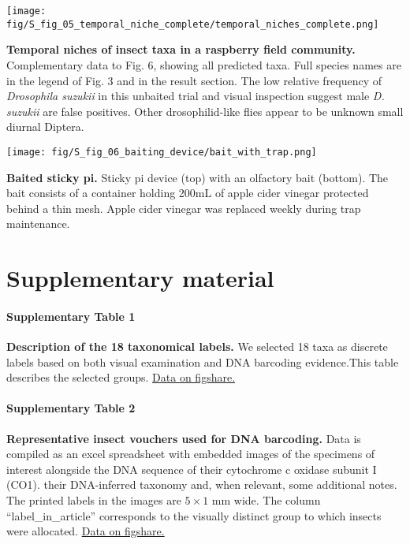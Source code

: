 \documentclass[12pt]{article}
\begin{document}
	\begin{supfig}[ht]
		\centering
		\texttt{[image: fig/S\_fig\_05\_temporal\_niche\_complete/temporal\_niches\_complete.png]}
		\caption{\textbf{Temporal niches of insect taxa in a raspberry field community.} Complementary data to Fig. 6, showing all predicted taxa. Full species names are in the legend of Fig. 3 and in the result section. The low relative frequency of \emph{Drosophila suzukii} in this unbaited trial and visual inspection suggest male \emph{D. suzukii} are false positives. Other drosophilid-like flies appear to be unknown small diurnal Diptera.}
		\label{supfig:04}
	\end{supfig}

	\pagebreak

	\begin{supfig}[ht]
		\centering
		\texttt{[image: fig/S\_fig\_06\_baiting\_device/bait\_with\_trap.png]}
		\caption{\textbf{Baited sticky pi.} Sticky pi device (top) with an olfactory bait (bottom). The bait consists of a container holding 200mL of apple cider vinegar protected behind a thin mesh. Apple cider vinegar was replaced weekly during trap maintenance.}
		\label{supfig:05}
	\end{supfig}

	
	\clearpage
	\newpage
	\section*{Supplementary material}

	\paragraph*{Supplementary Table 1}
	\textbf{Description of the 18 taxonomical labels.} We selected 18 taxa as discrete labels based on both visual examination and DNA barcoding evidence.This table describes the selected groups.
	\href{https://figshare.com/s/999a3b7a3c23a050b106}{Data on figshare.}

	\paragraph*{Supplementary Table 2}
	\textbf{Representative insect vouchers used for DNA barcoding.} 
	Data is compiled as an excel spreadsheet with embedded images of the specimens of interest alongside the DNA sequence of their cytochrome c oxidase subunit I (CO1). their DNA-inferred taxonomy and, when relevant, some additional notes. 
	The printed labels in the images are $5 \times{} 1$ mm wide. The column “label\_in\_article” corresponds to the visually distinct group to which insects were allocated.
	\href{https://figshare.com/s/bdb7bef8c26065e3dd17}{Data on figshare.}
\end{document}
